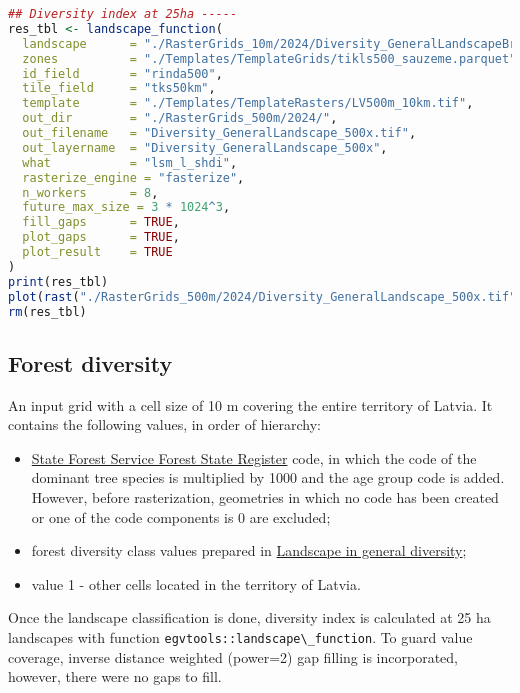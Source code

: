\documentclass[
]{book}
\newcommand{\passthrough}[1]{#1}
\begin{document}
\begin{lstlisting}[language=R]
## Diversity index at 25ha -----
res_tbl <- landscape_function(
  landscape      = "./RasterGrids_10m/2024/Diversity_GeneralLandscapeBroad.tif",
  zones          = "./Templates/TemplateGrids/tikls500_sauzeme.parquet",
  id_field       = "rinda500",
  tile_field     = "tks50km",
  template       = "./Templates/TemplateRasters/LV500m_10km.tif",
  out_dir        = "./RasterGrids_500m/2024/",
  out_filename   = "Diversity_GeneralLandscape_500x.tif",
  out_layername  = "Diversity_GeneralLandscape_500x",
  what           = "lsm_l_shdi",
  rasterize_engine = "fasterize",
  n_workers      = 8,
  future_max_size = 3 * 1024^3,
  fill_gaps      = TRUE,
  plot_gaps      = TRUE,
  plot_result    = TRUE
)
print(res_tbl)
plot(rast("./RasterGrids_500m/2024/Diversity_GeneralLandscape_500x.tif"))
rm(res_tbl)
\end{lstlisting}

\subsection{Forest diversity}\label{Ch05.04.02}

An input grid with a cell size of 10 m covering the entire territory of Latvia. It
contains the following values, in order of hierarchy:

\begin{itemize}
\item
  \hyperref[Ch04.01]{State Forest Service Forest State Register} code, in which the
  code of the dominant tree species is multiplied by 1000 and the age group
  code is added. However, before rasterization, geometries in which no code has
  been created or one of the code components is 0 are excluded;
\item
  forest diversity class values prepared in \hyperref[Ch05.04.01]{Landscape in general diversity};
\item
  value 1 - other cells located in the territory of Latvia.
\end{itemize}

Once the landscape classification is done, diversity index is calculated at 25 ha
landscapes with function \passthrough{\lstinline!egvtools::landscape\_function!}. To guard value coverage,
inverse distance weighted (power=2) gap filling is incorporated, however,
there were no gaps to fill.
\end{document}
